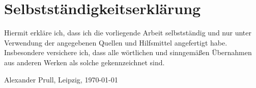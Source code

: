 \documentclass[11pt, a4paper, twoside, openright, final]{book}
\makeatletter
\numberwithin{equation}{chapter}		%
\renewcommand*{\cleardoublepage}{\clearpage\if@twoside \ifodd\c@page\else
\hbox{}%
\thispagestyle{empty}%
\newpage%
\if@twocolumn\hbox{}\newpage\fi\fi\fi}
\newcommand{\1}{\mathbbm{1}}
\makeatother
\begin{document}
\cleardoublepage




\cleardoublepage
\chapter*{Selbstständigkeitserklärung}
Hiermit erkläre ich, dass ich die vorliegende Arbeit selbstständig und nur unter Verwendung der angegebenen Quellen und Hilfsmittel angefertigt habe. Insbesondere versichere ich, dass alle wörtlichen und sinngemäßen Übernahmen aus anderen Werken als solche gekennzeichnet sind.
\bigskip\bigskip\bigskip\bigskip\bigskip\bigskip\bigskip\bigskip
\begin{flushright}
	Alexander Prull, Leipzig, \today
\end{flushright}
\end{document}
